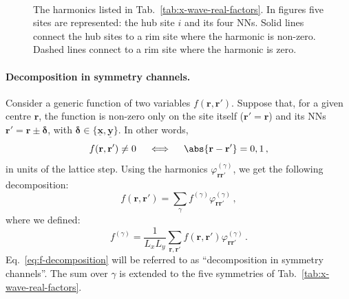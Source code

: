 \begin{figure}[t]
	\centering
	\hspace{2em}
	\\[3em]
	\subfloat[$p_x$-wave.]{
		
		\label{subfig:px-wave-correlator}
	}
	\hspace{2em}
	\subfloat[$p_y$-wave.]{
		
		\label{subfig:py-wave-correlator}
	}
	\hspace{2em}
	\subfloat[$d_{x^2-y^2}$-wave.]{
		
		\label{subfig:d-wave-correlator}
	}
	\caption{The harmonics listed in Tab.~\ref{tab:x-wave-real-factors}. In figures five sites are represented: the hub site $i$ and its four NNs. Solid lines connect the hub sites to a rim site where the harmonic is non-zero. Dashed lines connect to a rim site where the harmonic is zero.}
	\label{fig:x-wave-real-factors}
\end{figure}

\paragraph{Decomposition in symmetry channels.}

Consider a generic function of two variables $f(\mathbf{r},\mathbf{r}')$. Suppose that, for a given centre $\mathbf{r}$, the function is non-zero only on the site itself ($\mathbf{r}'=\mathbf{r}$) and its NNs $\mathbf{r}'=\mathbf{r}\pm\bm{\delta}$, with $\bm{\delta}\in\lbrace\underline{\mathbf{x}},\underline{\mathbf{y}}\rbrace$. In other words,
\begin{equation}\label{eq:f-NNs}
	f(\mathbf{r},\mathbf{r}') \neq 0
	\quad\iff\quad
	\abs{\mathbf{r}-\mathbf{r}'} = 0, 1 \, ,
\end{equation}
in units of the lattice step. Using the harmonics $\varphi_{\mathbf{r}\mathbf{r}'}^{(\gamma)}$, we get the following decomposition:
\begin{equation}\label{eq:f-decomposition}
	f(\mathbf{r},\mathbf{r}') = \sum_\gamma f^{(\gamma)} \varphi_{\mathbf{r}\mathbf{r}'}^{(\gamma)} \, ,
\end{equation}
where we defined:
\begin{equation}\label{eq:f-gamma}
	f^{(\gamma)} = \frac{1}{L_x L_y} \sum_{\mathbf{r},\mathbf{r}'} f(\mathbf{r},\mathbf{r}') \varphi_{\mathbf{r}\mathbf{r}'}^{(\gamma)} \, .
\end{equation}
Eq.~\eqref{eq:f-decomposition} will be referred to as ``decomposition in symmetry channels''. The sum over $\gamma$ is extended to the five symmetries of Tab.~\ref{tab:x-wave-real-factors}.

